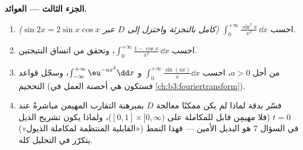 \begin{problem}
\medskip
\noindent\textbf{الجزء الثالث --- العوائد.}
\begin{enumerate}[resume]
  \item احسب $\int_0^{+\infty}\frac{\sin^2x}{x^2}\,\dd x$ \emph{(كامل بالتجزئة واختزل إلى $D$ عبر
        $\sin
        2x = 2\sin x\cos x$)}.
  \item احسب $\int_0^{+\infty}\frac{1 -
        \cos x}{x^2}\,\dd x$، وتحقق من اتساق النتيجتين.
  \item من أجل $a > 0$، احسب $\int_0^{+\infty}\frac{\sin(ax)}x\dd x$ و $\int_{-\infty}^{+\infty}\eu^{-ax^2}\dd x$، وسجّل قواعد
        التحجيم (فستكون هي أحصنة العمل في \cref{ch:b3:fouriertransform}).
  \item فسّر بدقة لماذا لم يكن ممكنًا معالجة $D$ بمبرهنة التقارب
        المهيمن مباشرةً عند $t = 0$ (فلا مهيمِن قابل للمكاملة
        على $[0,1]\times[0,\infty)$)، ولماذا يكون تشريح الذيل في السؤال 7 هو
        البديل الأمين --- فهذا النمط («القابلية المنتظمة
        لمكاملة الذيول») يتكرّر في التحليل كله.
\end{enumerate}


\end{problem}
